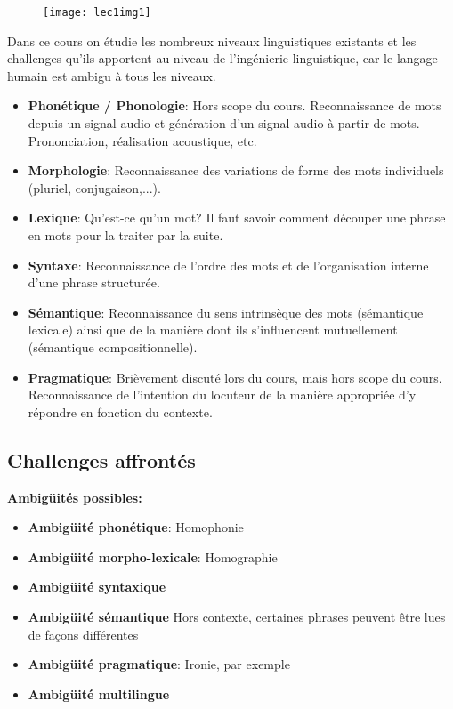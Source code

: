 \begin{figure}[H]
\centering
\texttt{[image: lec1img1]}
\end{figure}

Dans ce cours on étudie les nombreux niveaux linguistiques existants et les challenges qu'ils apportent au niveau
de l'ingénierie linguistique, car le langage humain est ambigu à tous les niveaux.\\

\begin{itemize}
    \item \textbf{Phonétique / Phonologie}: Hors scope du cours. Reconnaissance de mots depuis un signal audio et
    génération d'un signal audio à partir de mots. Prononciation, réalisation acoustique, etc.
    \item \textbf{Morphologie}: Reconnaissance des variations de forme des mots individuels (pluriel, conjugaison,...).
    \item \textbf{Lexique}: Qu'est-ce qu'un mot? Il faut savoir comment découper une phrase en mots pour la traiter par la suite.
    \item \textbf{Syntaxe}: Reconnaissance de l'ordre des mots et de l'organisation interne d'une phrase structurée.
    \item \textbf{Sémantique}: Reconnaissance du sens intrinsèque des mots (sémantique lexicale) ainsi que de la manière dont
    ils s'influencent mutuellement (sémantique compositionnelle).
    \item \textbf{Pragmatique}: Brièvement discuté lors du cours, mais hors scope du cours. Reconnaissance de l'intention du
    locuteur de la manière appropriée d'y répondre en fonction du contexte.
\end{itemize}

\subsection{Challenges affrontés}

\textbf{Ambigüités possibles:}

\begin{itemize}
    \item \textbf{Ambigüité phonétique}: Homophonie
    \item \textbf{Ambigüité morpho-lexicale}: Homographie
    \item \textbf{Ambigüité syntaxique}
    \item \textbf{Ambigüité sémantique} Hors contexte, certaines phrases peuvent être lues de façons différentes
    \item \textbf{Ambigüité pragmatique}: Ironie, par exemple
    \item \textbf{Ambigüité multilingue} \\
\end{itemize}

